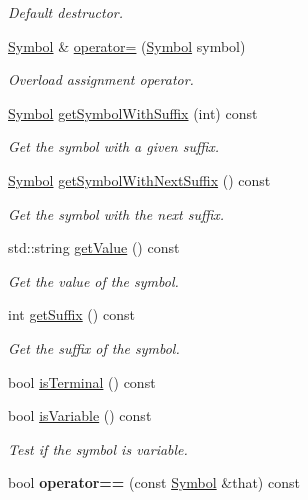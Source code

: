 \begin{DoxyCompactItemize}
\begin{DoxyCompactList}\small\item\em \-Default destructor. \end{DoxyCompactList}\item 
\hypertarget{class_symbol_a5e6629d94e9b4a99ed35eefb91d3b639}{\hyperlink{class_symbol}{\-Symbol} \& \hyperlink{class_symbol_a5e6629d94e9b4a99ed35eefb91d3b639}{operator=} (\hyperlink{class_symbol}{\-Symbol} symbol)}\label{class_symbol_a5e6629d94e9b4a99ed35eefb91d3b639}

\begin{DoxyCompactList}\small\item\em \-Overload assignment operator. \end{DoxyCompactList}\item 
\hyperlink{class_symbol}{\-Symbol} \hyperlink{class_symbol_a78946d813668b5e8e9d9a237e1e5e55a}{get\-Symbol\-With\-Suffix} (int) const 
\begin{DoxyCompactList}\small\item\em \-Get the symbol with a given suffix. \end{DoxyCompactList}\item 
\hyperlink{class_symbol}{\-Symbol} \hyperlink{class_symbol_a311c192bc284c43f350f48fcbc526e74}{get\-Symbol\-With\-Next\-Suffix} () const 
\begin{DoxyCompactList}\small\item\em \-Get the symbol with the next suffix. \end{DoxyCompactList}\item 
std\-::string \hyperlink{class_symbol_ab5fa6310ed71838984240d83931fea47}{get\-Value} () const 
\begin{DoxyCompactList}\small\item\em \-Get the value of the symbol. \end{DoxyCompactList}\item 
int \hyperlink{class_symbol_a75350cc87e70ee9fd8c81867b878ca59}{get\-Suffix} () const 
\begin{DoxyCompactList}\small\item\em \-Get the suffix of the symbol. \end{DoxyCompactList}\item 
bool \hyperlink{class_symbol_a191d3ad4fd529cc8b26b871c6f4d90bf}{is\-Terminal} () const 
\item 
bool \hyperlink{class_symbol_a171fd65a9483a3c4a1fa8c05569f4665}{is\-Variable} () const 
\begin{DoxyCompactList}\small\item\em \-Test if the symbol is variable. \end{DoxyCompactList}\item 
\hypertarget{class_symbol_aa74bab4fabc963471bd2888e63059711}{bool {\bfseries operator==} (const \hyperlink{class_symbol}{\-Symbol} \&that) const }\label{class_symbol_aa74bab4fabc963471bd2888e63059711}


\end{DoxyCompactItemize}
